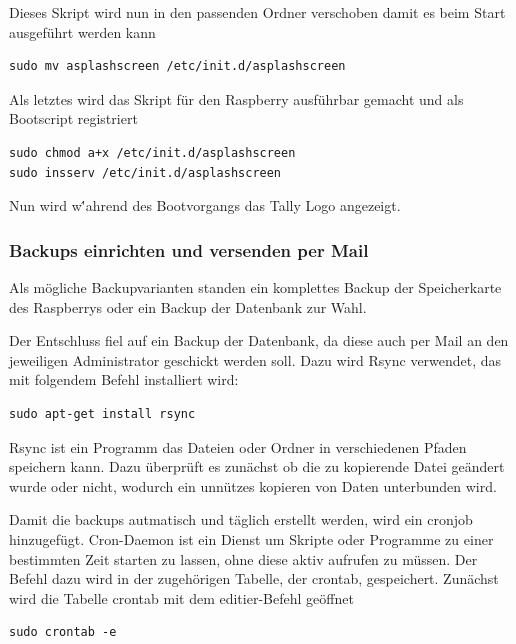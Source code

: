 \documentclass[11pt,a4paper]{article} %
\begin{document}
Dieses Skript wird nun in den passenden Ordner verschoben damit es beim Start ausgeführt werden kann
\begin{frame}

\begin{lstlisting}
sudo mv asplashscreen /etc/init.d/asplashscreen
\end{lstlisting}
\end{frame}

Als letztes wird das Skript für den Raspberry ausführbar gemacht und als Bootscript registriert
\begin{frame}

\begin{lstlisting}
sudo chmod a+x /etc/init.d/asplashscreen
sudo insserv /etc/init.d/asplashscreen
\end{lstlisting}
\end{frame}

Nun wird w\''ahrend des Bootvorgangs das Tally Logo angezeigt.
\newpage

\subsubsection{Backups einrichten und versenden per Mail}
Als m\"ogliche Backupvarianten standen ein komplettes Backup der Speicherkarte des Raspberrys oder ein Backup der Datenbank zur Wahl.
\par
Der Entschluss fiel auf ein Backup der Datenbank, da diese auch per Mail an den jeweiligen Administrator geschickt werden soll. Dazu wird Rsync verwendet, das mit folgendem Befehl installiert wird:
\begin{frame}

\begin{lstlisting}
sudo apt-get install rsync
\end{lstlisting}
\end{frame}
 Rsync ist ein Programm das Dateien oder Ordner in verschiedenen Pfaden speichern kann. Dazu überprüft es zunächst ob die zu kopierende Datei geändert wurde oder nicht, wodurch ein unnützes kopieren von Daten unterbunden wird.
\par
Damit die backups autmatisch und täglich erstellt werden, wird ein cronjob hinzugefügt. Cron-Daemon ist ein Dienst um Skripte oder Programme zu einer bestimmten Zeit starten zu lassen, ohne diese aktiv aufrufen zu müssen. Der Befehl dazu wird in der zugehörigen Tabelle, der crontab, gespeichert. Zunächst wird die Tabelle crontab mit dem editier-Befehl geöffnet
\begin{frame}

\begin{lstlisting}
sudo crontab -e
\end{lstlisting}
\end{frame}
\end{document}
